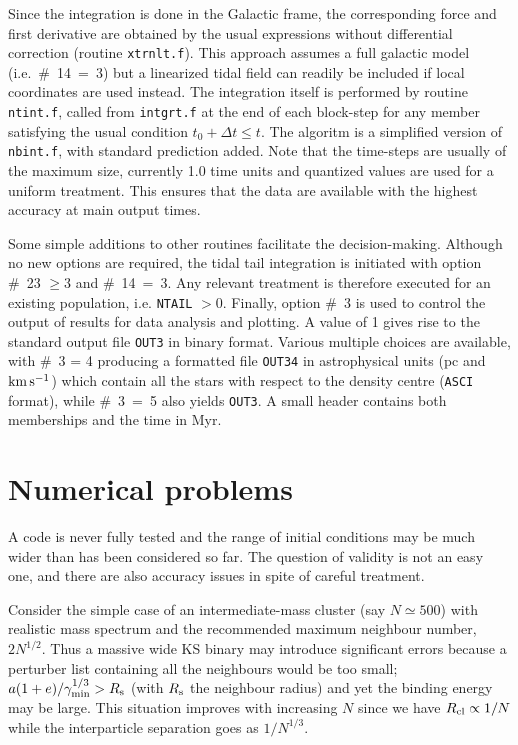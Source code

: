 \documentclass[12pt]{article}
\begin{document}
Since the integration is done in the Galactic frame, the corresponding
force and first derivative are obtained by the usual expressions without
differential correction (routine {\tt xtrnlt.f}).
This approach assumes a full galactic model (i.e.~\#~14~=~3) but a
linearized tidal field can readily be included if local coordinates are
used instead.
The integration itself is performed by routine {\tt ntint.f}, called from
{\tt intgrt.f} at the end of each block-step for any member satisfying
the usual condition $t_0 + \Delta t \le t$.
The algoritm is a simplified version of {\tt nbint.f}, with standard
prediction added.
Note that the time-steps are usually of the maximum size, currently 1.0
time units and quantized values are used for a uniform treatment.
This ensures that the data are available with the highest accuracy at main
output times.

Some simple additions to other routines facilitate the decision-making.
Although no new options are required, the tidal tail integration is
initiated with option \#~23 $\ge 3$ and \#~14~=~3.
Any relevant treatment is therefore executed for an existing population,
i.e. {\tt NTAIL} $> 0$.
Finally, option \#~3 is used to control the output of results for data
analysis and plotting.
A value of 1 gives rise to the standard output file {\tt OUT3} in binary
format.
Various multiple choices are available, with \#~3 = 4 producing a formatted
file {\tt OUT34} in astrophysical units (pc and ${\rm km}\,{\rm s}^{-1}$) which contain all
the stars with respect to the density centre ({\tt ASCI} format), while
\#~3~=~5 also yields {\tt OUT3}.
A small header contains both memberships and the time in Myr.

\section{Numerical problems}

A code is never fully tested and the range of initial conditions may be
much wider than has been considered so far.
The question of validity is not an easy one, and there are also accuracy
issues in spite of careful treatment.

Consider the simple case of an intermediate-mass cluster
(say $N \simeq 500$) with realistic mass spectrum and the recommended
maximum neighbour number, $2 N^{1/2}$.
Thus a massive wide KS binary may introduce significant errors because a
perturber list containing all the neighbours would be too small; \ie
$a (1 + e)/ \gamma_{\rm min}^{1/3} > R_{\rm s}$ (with $R_{\rm s}$ the
neighbour radius) and yet the binding energy may be large.
This situation improves with increasing $N$ since we have
$R_{\rm cl} \propto 1/N$ while the interparticle separation goes as
$1/N^{1/3}$.
\end{document}
